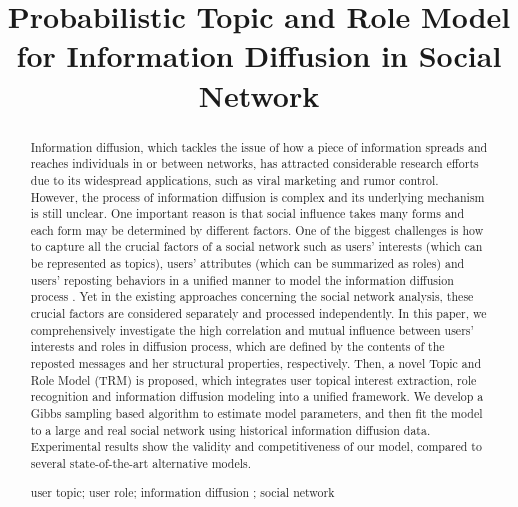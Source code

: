 \documentclass[runningheads,a4paper]{llncs}
\newcommand{\keywords}[1]{\par\addvspace\baselineskip
\noindent\keywordname\enspace\ignorespaces#1}
\begin{document}
\mainmatter  %

\title{Probabilistic Topic and Role Model for Information Diffusion in Social Network}


%
%

\maketitle




\begin{abstract}
Information diffusion, which tackles the issue of how a piece of information spreads and reaches individuals in or between networks, has attracted considerable research efforts due to its widespread applications, such as viral marketing and rumor control. However, the process of information diffusion is complex and its underlying mechanism is still unclear. One important reason is that social influence takes many forms and each form may be determined by different factors. One of the biggest challenges is how to capture all the crucial factors of a social network such as users' interests (which can be represented as topics), users' attributes (which can be summarized as roles) and users' reposting behaviors in a unified manner to model the information diffusion process . Yet in the existing approaches concerning the social network analysis, these crucial factors are considered separately and processed independently. In this paper, we comprehensively investigate the high correlation and mutual influence between users' interests and roles in diffusion process, which are defined by the contents of the reposted messages and her structural properties, respectively. Then, a novel Topic and Role Model (TRM) is proposed, which integrates user topical interest extraction, role recognition and information diffusion modeling into a unified framework. We develop a Gibbs sampling based algorithm to estimate model parameters, and then fit the model to a large and real social network using historical information diffusion data. Experimental results show the validity and competitiveness of our model, compared to several state-of-the-art alternative models.

\keywords{user topic; user role; information diffusion ; social network}
\end{abstract}
\end{document}
